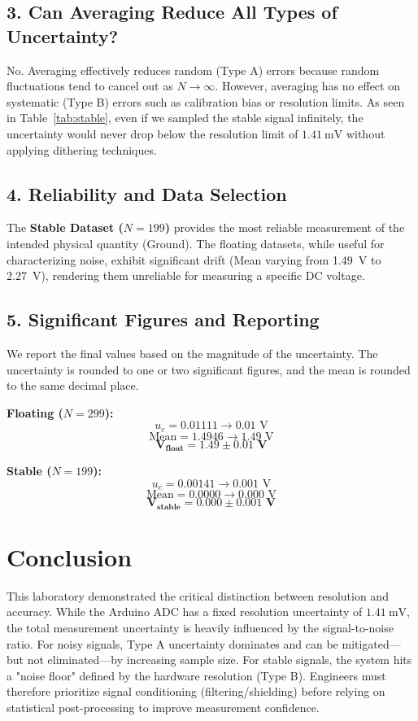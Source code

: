 \documentclass[11pt]{article}
\begin{document}
\subsection{3. Can Averaging Reduce All Types of Uncertainty?}
No. Averaging effectively reduces random (Type A) errors because random fluctuations tend to cancel out as $N \rightarrow \infty$. However, averaging has no effect on systematic (Type B) errors such as calibration bias or resolution limits. As seen in Table~\ref{tab:stable}, even if we sampled the stable signal infinitely, the uncertainty would never drop below the resolution limit of $\SI{1.41}{\milli\volt}$ without applying dithering techniques.

\subsection{4. Reliability and Data Selection}
The \textbf{Stable Dataset ($N=199$)} provides the most reliable measurement of the intended physical quantity (Ground). The floating datasets, while useful for characterizing noise, exhibit significant drift (Mean varying from \SI{1.49}{\volt} to \SI{2.27}{\volt}), rendering them unreliable for measuring a specific DC voltage.

\subsection{5. Significant Figures and Reporting}
We report the final values based on the magnitude of the uncertainty. The uncertainty is rounded to one or two significant figures, and the mean is rounded to the same decimal place.

\textbf{Floating ($N=299$):}
\[ u_c = 0.01111 \rightarrow 0.01 \text{ V} \]
\[ \text{Mean} = 1.4946 \rightarrow 1.49 \text{ V} \]
\[ \mathbf{V_{float} = 1.49 \pm 0.01 \text{ V} } \]

\textbf{Stable ($N=199$):}
\[ u_c = 0.00141 \rightarrow 0.001 \text{ V} \]
\[ \text{Mean} = 0.0000 \rightarrow 0.000 \text{ V} \]
\[ \mathbf{V_{stable} = 0.000 \pm 0.001 \text{ V} } \]

\section{Conclusion}
This laboratory demonstrated the critical distinction between resolution and accuracy. While the Arduino ADC has a fixed resolution uncertainty of $\SI{1.41}{\milli\volt}$, the total measurement uncertainty is heavily influenced by the signal-to-noise ratio. For noisy signals, Type A uncertainty dominates and can be mitigated—but not eliminated—by increasing sample size. For stable signals, the system hits a "noise floor" defined by the hardware resolution (Type B). Engineers must therefore prioritize signal conditioning (filtering/shielding) before relying on statistical post-processing to improve measurement confidence.
\end{document}

